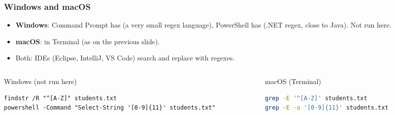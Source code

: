 \documentclass[aspectratio=169,10pt,compress]{beamer}
\newcommand{\win}{\textbf{Windows}}
\newcommand{\mac}{\textbf{macOS}}
\begin{document}
\begin{frame}[t,fragile] \frametitle{Windows and macOS}
  \begin{itemize}\small
    \item \win: Command Prompt has  (a very small regex language), PowerShell has  (.NET regex, close to Java). Not run here.
    \item \mac:  in Terminal (as on the previous slide).
    \item Both: IDEs (Eclipse, IntelliJ, VS Code) search and replace with regexes.
  \end{itemize}
  \begin{columns}[T]
    \begin{column}{0.48\textwidth}
      \begin{block}{Windows (not run here)}


\begin{lstlisting}[style=codesnippet, language={}, basicstyle=\ttfamily\scriptsize]
findstr /R "^[A-Z]" students.txt
powershell -Command "Select-String '[0-9]{11}' students.txt"
\end{lstlisting}


      \end{block}
    \end{column}
    \begin{column}{0.48\textwidth}
      \begin{block}{macOS (Terminal)}


\begin{lstlisting}[style=codesnippet, language=bash, basicstyle=\ttfamily\scriptsize]
grep -E '^[A-Z]' students.txt
grep -E -o '[0-9]{11}' students.txt
\end{lstlisting}


      \end{block}
    \end{column}
  \end{columns}
\end{frame}

\end{document}
